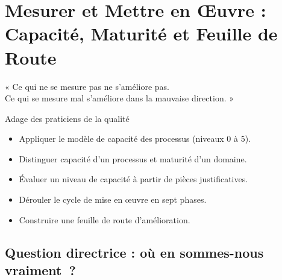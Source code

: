 
\chapter{Mesurer et Mettre en Œuvre : Capacité, Maturité et Feuille de Route}
\label{chap:cobit-capacite}

\epigraph{%
    « Ce qui ne se mesure pas ne s'améliore pas.\\
    Ce qui se mesure mal s'améliore dans la mauvaise direction. »%
}{Adage des praticiens de la qualité}


\begin{boxobjectifs}
\begin{itemize}
    \item Appliquer le modèle de capacité des processus (niveaux 0 à 5).
    \item Distinguer capacité d'un processus et maturité d'un domaine.
    \item Évaluer un niveau de capacité à partir de pièces justificatives.
    \item Dérouler le cycle de mise en œuvre en sept phases.
    \item Construire une feuille de route d'amélioration.
\end{itemize}
\end{boxobjectifs}

\bigskip

\section*{Question directrice : où en sommes-nous vraiment~?}


